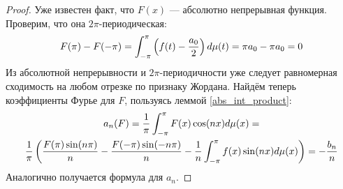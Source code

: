 \begin{proof}
	Уже известен факт, что $F(x)$ --- абсолютно непрерывная функция. Проверим, что она $2\pi$-периодическая:
	\[
		F(\pi) - F(-\pi) = \int_{-\pi}^\pi \left(f(t) - \frac{a_0}{2}\right)d\mu(t) = \pi a_0 - \pi a_0 = 0
	\]
	Из абсолютной непрерывности и $2\pi$-периодичности уже следует равномерная сходимость на любом отрезке по признаку Жордана. Найдём теперь коэффициенты Фурье для $F$, пользуясь леммой \ref{abs_int_product}:
	\begin{multline*}
		a_n(F) = \frac{1}{\pi} \int_{-\pi}^\pi F(x)\cos(nx)d\mu(x) = \\ \frac{1}{\pi}\left(\frac{F(\pi)\sin(n\pi)}{n} - \frac{F(-\pi)\sin(-n\pi)}{n} - \frac{1}{n} \int_{-\pi}^\pi f(x)\sin(nx)d\mu(x)\right) = -\frac{b_n}{n}
	\end{multline*}
	Аналогично получается формула для $a_n$.
\end{proof}